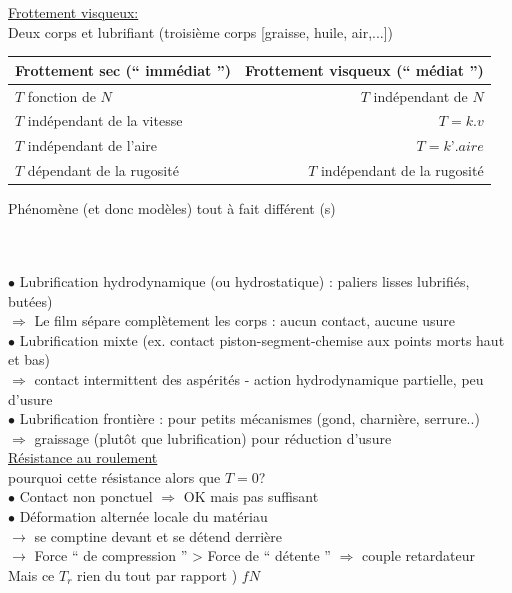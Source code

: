 \underline{Frottement visqueux:}\\
Deux corps et lubrifiant (troisième corps [graisse, huile, air,...])\\

\begin{center}
\begin{tabular}{l||r}
{\color{orange}Frottement sec (“ immédiat ”)}&{\color{orange}Frottement visqueux (“ médiat ”)}\\
\hline
$T$ fonction de $N$&$T$ indépendant de $N$\\
$T$ indépendant de la vitesse&$T = k.v$\\
$T$ indépendant de l’aire&$T = k’. aire$\\
$T$ dépendant de la rugosité&$T$ indépendant de la rugosité
\end{tabular}
\end{center}
\begin{orangebox}
Phénomène (et donc modèles) tout à fait différent (s)
\end{orangebox}\\\\

\noindent$\bullet$ Lubrification hydrodynamique (ou hydrostatique) : paliers lisses lubrifiés, butées) \\
$\Rightarrow$ Le film sépare complètement les corps : aucun contact, {\color{orange}aucune usure}\\
$\bullet$ Lubrification mixte (ex. contact piston-segment-chemise aux points morts haut et bas)\\
$\Rightarrow$ contact intermittent des aspérités - action hydrodynamique partielle, {\color{orange}peu d'usure}\\
$\bullet$ Lubrification frontière : pour petits mécanismes (gond, charnière, serrure..)\\
$\Rightarrow$ graissage (plutôt que lubrification) pour réduction d’usure\\

\underline{Résistance au roulement}\\
pourquoi cette résistance alors que $T=0$?\\
$\bullet$ Contact non ponctuel $\Rightarrow$ OK mais pas suffisant\\
$\bullet$ Déformation alternée locale du matériau \\
$\rightarrow$  se comptine devant et se détend derrière\\
$\rightarrow$ Force “ de compression ” > Force de “ détente ” $\Rightarrow$ couple retardateur\\
Mais ce $T_r$ rien du tout par rapport ) $fN$\\


